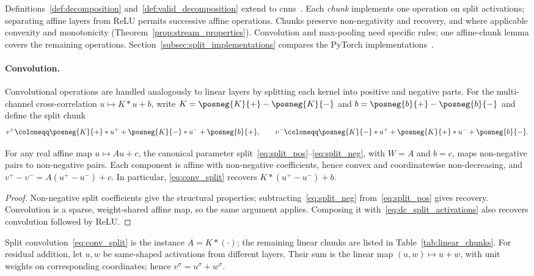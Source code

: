 Definitions~\ref{def:decomposition} and~\ref{def:valid_decomposition} extend to \acp{cnn}~\parencite{Simonyan2015,He2016resnet}. Each \emph{chunk} implements one operation on split activations; separating affine layers from ReLU permits successive affine operations. Chunks preserve non-negativity and recovery, and where applicable convexity and monotonicity (Theorem~\ref{prop:stream_properties}). Convolution and max-pooling need specific rules; one affine-chunk lemma covers the remaining operations. Section~\ref{subsec:split_implementations} compares the PyTorch implementations~\parencite{Paszke2019PyTorch}.

\paragraph{Convolution.}
Convolutional operations are handled analogously to linear layers by splitting each kernel into positive and negative parts. For the multi-channel cross-correlation $u\mapsto K*u+b$, write $K=\posneg{K}{+}-\posneg{K}{-}$ and $b=\posneg{b}{+}-\posneg{b}{-}$ and define the split chunk
\begin{equation}
	v^+ \coloneqq \posneg{K}{+} * u^+ + \posneg{K}{-} * u^- + \posneg{b}{+},
	\qquad
	v^- \coloneqq \posneg{K}{-} * u^+ + \posneg{K}{+} * u^- + \posneg{b}{-}.
	\label{eq:conv_split}
\end{equation}

\begin{lemmaenv}\label{lem:linear_chunk}
For any real affine map $u\mapsto Au+c$, the canonical parameter split~\eqref{eq:split_pos}--\eqref{eq:split_neg}, with $W=A$ and $b=c$, maps non-negative pairs to non-negative pairs. Each component is affine with non-negative coefficients, hence convex and coordinatewise non-decreasing, and $v^+-v^-=A(u^+-u^-)+c$. In particular, \eqref{eq:conv_split} recovers $K*(u^+-u^-)+b$.
\end{lemmaenv}
\begin{proof}
Non-negative split coefficients give the structural properties; subtracting~\eqref{eq:split_neg} from~\eqref{eq:split_pos} gives recovery. Convolution is a sparse, weight-shared affine map, so the same argument applies. Composing it with~\eqref{eq:dc_split_activations} also recovers convolution followed by ReLU.
\end{proof}

Split convolution~\eqref{eq:conv_split} is the instance $A = K*(\cdot)$; the remaining linear chunks are listed in Table~\ref{tab:linear_chunks}. For residual addition, let $u,w$ be same-shaped activations from different layers. Their sum is the linear map $(u,w)\mapsto u+w$, with unit weights on corresponding coordinates; hence $v^\sigma=u^\sigma+w^\sigma$.

